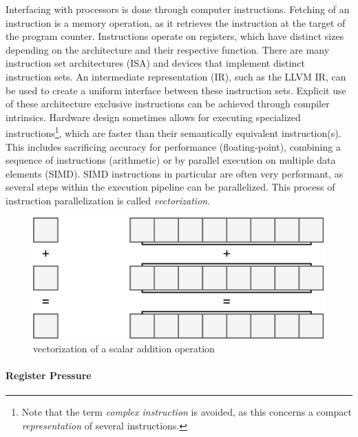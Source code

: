 \documentclass{article}
\begin{document}
Interfacing with processors is done through computer instructions.
Fetching of an instruction is a memory operation, as it retrieves the instruction at the target of the program counter.
Instructions operate on registers, which have distinct sizes depending on the architecture and their respective function.
There are many instruction set architectures (ISA) and devices that implement distinct instruction sets.
An intermediate representation (IR), such as the LLVM IR\cite{LLVM}, can be used to create a uniform interface between these instruction sets\cite{intermediate-representation}.
Explicit use of these architecture exclusive instructions can be achieved through compiler intrinsics.
Hardware design sometimes allows for executing specialized instructions\footnote{Note that the term {\it complex instruction} is avoided, as this concerns a compact {\it representation} of several instructions. }, which are faster than their semantically equivalent instruction(s).
This includes sacrificing accuracy for performance (floating-point), combining a sequence of instructions (arithmetic) or by parallel execution on multiple data elements (SIMD).
SIMD instructions in particular are often very performant, as several steps within the execution pipeline can be parallelized.
This process of instruction parallelization is called {\it vectorization}.

\begin{figure}[ht]
    \centering
    \includegraphics[scale=0.2]{vectorization}
    \caption{ vectorization of a scalar addition operation }
\end{figure}

\newpage

\paragraph{Register Pressure} 
\end{document}

